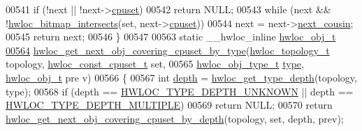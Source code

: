 \begin{DoxyCode}
00541   \textcolor{keywordflow}{if} (!next || !next->\hyperlink{a00016_a67925e0f2c47f50408fbdb9bddd0790f}{cpuset})
00542     \textcolor{keywordflow}{return} NULL;
00543   \textcolor{keywordflow}{while} (next && !\hyperlink{a00065_ga575c27953709a8cb9a047aae65157526}{hwloc_bitmap_intersects}(\textcolor{keyword}{set}, next->\hyperlink{a00016_a67925e0f2c47f50408fbdb9bddd0790f}{cpuset}))
00544     next = next->\hyperlink{a00016_a85a788017457129589318b6c39451acf}{next_cousin};
00545   \textcolor{keywordflow}{return} next;
00546 \}
00547 
00563 \textcolor{keyword}{static} \_\_hwloc\_inline \hyperlink{a00016}{hwloc_obj_t}
\hypertarget{a00031_source_l00564}{}\hyperlink{a00056_ga5915ea30f326676b3a4cfff371ce04d1}{00564} \hyperlink{a00056_ga5915ea30f326676b3a4cfff371ce04d1}{hwloc_get_next_obj_covering_cpuset_by_type}(\hyperlink{a00039_ga9d1e76ee15a7dee158b786c30b6a6e38}{hwloc_topology_t} topology, 
      \hyperlink{a00040_ga1f784433e9b606261f62d1134f6a3b25}{hwloc_const_cpuset_t} \textcolor{keyword}{set},
00565                                            \hyperlink{a00041_gacd37bb612667dc437d66bfb175a8dc55}{hwloc_obj_type_t} \hyperlink{a00016_acc4f0803f244867e68fe0036800be5de}{type}, \hyperlink{a00016}{hwloc_obj_t} pre
      v)
00566 \{
00567   \textcolor{keywordtype}{int} \hyperlink{a00016_a9d82690370275d42d652eccdea5d3ee5}{depth} = \hyperlink{a00046_gaea7c64dd59467f5201ba87712710b14d}{hwloc_get_type_depth}(topology, type);
00568   \textcolor{keywordflow}{if} (depth == \hyperlink{a00046_ggaf4e663cf42bbe20756b849c6293ef575a0565ab92ab72cb0cec91e23003294aad}{HWLOC_TYPE_DEPTH_UNKNOWN} || depth == \hyperlink{a00046_ggaf4e663cf42bbe20756b849c6293ef575ae99465995cacde6c210d5fc2e409798c}{HWLOC_TYPE_DEPTH_MULTIPLE})
00569     \textcolor{keywordflow}{return} NULL;
00570   \textcolor{keywordflow}{return} \hyperlink{a00056_ga2f9a4ec15e9cfae8c21501257a51ce5b}{hwloc_get_next_obj_covering_cpuset_by_depth}(topology, \textcolor{keyword}{set}, depth, prev);
      

\end{DoxyCode}
